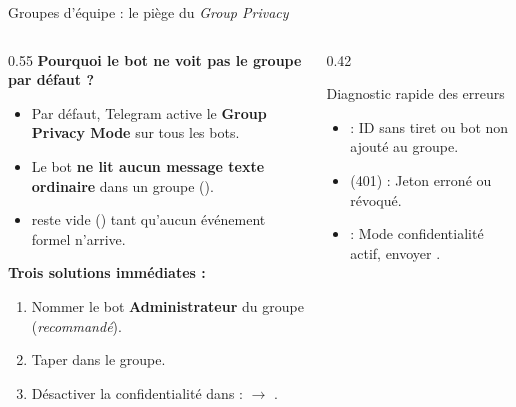 \documentclass[aspectratio=169,10pt,t]{beamer}
\begin{document}
\begin{frame}[fragile]{Groupes d'\'equipe : le pi\`ege du \emph{Group Privacy}}
\begin{columns}[T]\begin{column}{0.55\textwidth}
\textbf{Pourquoi le bot ne voit pas le groupe par d\'efaut ?}
\begin{itemize}
\item Par d\'efaut, Telegram active le \textbf{Group Privacy Mode} sur tous les bots.
\item Le bot \textbf{ne lit aucun message texte ordinaire} dans un groupe ().
\item {} reste vide () tant qu'aucun \'ev\'enement formel n'arrive.
\end{itemize}
\vspace{0.2cm}
\textbf{Trois solutions imm\'ediates :}
\begin{enumerate}
\item Nommer le bot \textbf{Administrateur} du groupe (\emph{recommand\'e}).
\item Taper  dans le groupe.
\item D\'esactiver la confidentialit\'e dans  :  $\rightarrow$ .
\end{enumerate}
\end{column}\begin{column}{0.42\textwidth}
\begin{block}{Diagnostic rapide des erreurs}
\footnotesize
\begin{itemize}
\item {} : ID sans tiret \code{-} ou bot non ajout\'e au groupe.
\item {} (401) : Jeton erron\'e ou r\'evoqu\'e.
\item {} : Mode confidentialit\'e actif, envoyer .
\end{itemize}
\end{block}
\end{column}\end{columns}
\end{frame}
\end{document}
